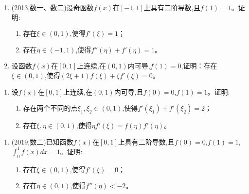 \documentclass[12pt, a4paper, oneside, UTF8]{ctexbook}
\begin{document}
\begin{enumerate}[label=\arabic*.,start=25]
    \item  (2013,数一、数二)设奇函数$f(x)$在$[-1,1]$上具有二阶导数,且$f(1)=1$。证明:
    \begin{enumerate}[label=(\roman*)]
        \item 存在$\xi\in(0,1)$,使得$f'(\xi)=1$；
        \item 存在$\eta\in(-1,1)$,使得$f''(\eta)+f'(\eta)=1$。
    \end{enumerate}
    
    \begin{solution}
    \newpage
    \end{solution}
    
    \item  设函数$f(x)$在$[0,1]$上连续,在$(0,1)$内可导,$f(1)=0$,证明：存在$\xi\in(0,1)$,使得$(2\xi+1)f(\xi)+\xi f'(\xi)=0$。
    
    \begin{solution}
    \newpage
    \end{solution}
\end{enumerate}

\begin{remark}
\end{remark}

\begin{enumerate}[label=\arabic*.,start=27]
    \item  设$f(x)$在$[0,1]$上连续,在$(0,1)$内可导,且$f(0)=0$,$f(1)=1$。证明:
    \begin{enumerate}[label=(\roman*)]
        \item 存在两个不同的点$\xi_1,\xi_2\in(0,1)$,使得$f'(\xi_1)+f'(\xi_2)=2$；
        \item 存在$\xi,\eta\in(0,1)$,使得$\eta f'(\xi)=f(\eta)f'(\eta)$。
    \end{enumerate}
    
    \begin{solution}
    \newpage
    \end{solution}
\end{enumerate}

\begin{remark}
\end{remark}

\begin{enumerate}[label=\arabic*.,start=28]
    \item  (2019,数二)已知函数$f(x)$在$[0,1]$上具有二阶导数,且$f(0)=0$,$f(1)=1$,$\int_0^1 f(x)dx=1$。证明:
    \begin{enumerate}[label=(\roman*)]
        \item 存在$\xi\in(0,1)$,使得$f'(\xi)=0$；
        \item 存在$\eta\in(0,1)$,使得$f''(\eta)<-2$。
    \end{enumerate}
    
    \begin{solution}
    \newpage
    \end{solution}
\end{enumerate}

\ifx\allfiles\undefined
\end{document}
